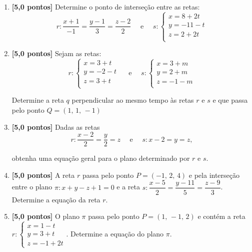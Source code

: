 \documentclass[12pt,a4paper]{article}
\begin{document}
\begin{enumerate}

  \item \textbf{[5,0 pontos]} Determine o ponto de interseção entre as retas:
 $$
   r: \dfrac{x + 1}{-1} = \dfrac{y - 1}{3} = \dfrac{z - 2}{2}
   \quad \textrm{ e }\quad
   s:\begin{cases}
     x = 8 + 2t\\
     y = -11 - t\\
     z = 2 + 2t\\
   \end{cases}
 $$ 
  
  \item \textbf{[5,0 pontos]} Sejam as retas:
 $$
   r:\begin{cases}
     x = 3 + t\\
     y = -2 - t\\
     z = 3 + t\\
   \end{cases}
   \quad \textrm{ e }\quad
   s:\begin{cases}
     x = 3 + m\\
     y = 2 + m\\
     z = -1 - m\\
   \end{cases}
 $$ 
 
 Determine a reta $q$ perpendicular ao mesmo tempo às retas $r$ e $s$ e que
 passa pelo ponto $Q = (1,\,1,\,-1)$

  \item \textbf{[5,0 pontos]} Dadas as retas
 $$
   r: \dfrac{x-2}{2} = \dfrac{y}{2} = z \quad \textrm{ e }\quad s: x - 2 = y = z,
 $$

 obtenha uma equação geral para o plano determinado por $r$ e $s$.
    
  \item \textbf{[5,0 pontos]} A reta $r$ passa pelo ponto $P = (-1,\, 2,\, 4)$
  e pela interseção entre o plano $\pi : x + y - z + 1 = 0$ e a reta 
  $s : \dfrac{x - 5}{2} = \dfrac{y - 11}{5} = \dfrac{z - 9}{3}$. Determine 
  a equação da reta $r$.

  \item \textbf{[5,0 pontos]} O plano $\pi$ passa pelo ponto $P = (1,\, -1,\, 2)$ e 
  contém a reta $r : \begin{cases} x = 1 - t \\ y = 3 + t \\ z = -1 + 2t\end{cases}$. 
  Determine a equação do plano $\pi$.
    
 
\end{enumerate}
\end{document}
